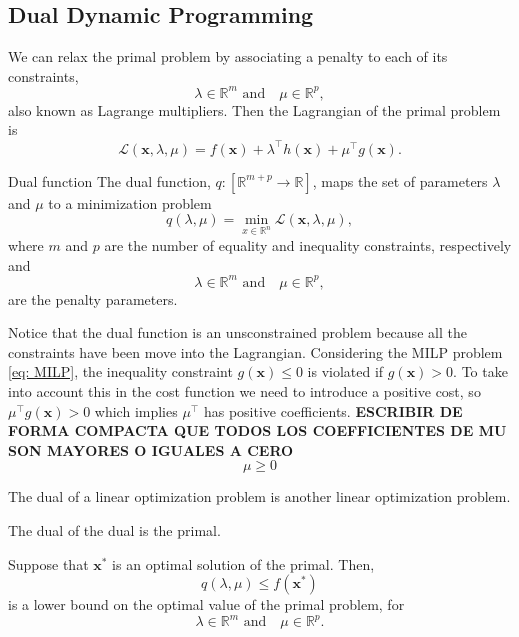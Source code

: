 \subsection{Dual Dynamic Programming}
We can relax the primal problem by associating a penalty to each of its constraints,
\begin{equation}
    \lambda\in\mathbb{R}^{m}\,\, \text{and} \quad \mu\in\mathbb{R}^{p},
\end{equation}
also known as Lagrange multipliers. Then the Lagrangian of the primal problem is
\begin{equation}
    \mathcal{L}(\textbf{x}, \lambda, \mu) = f(\textbf{x}) + \lambda^{\intercal}h(\textbf{x}) + \mu^{\intercal}g(\textbf{x}).
\end{equation}
\begin{definition}{Dual function}{}
The dual function, $q: \left[\mathbb{R}^{m+p}\rightarrow\mathbb{R}\right]$, maps the set of parameters $\lambda$ and $\mu$ to a minimization problem
\begin{equation}
    q(\lambda, \mu) = \min_{x\in\mathbb{R}^{n}}\mathcal{L}(\textbf{x}, \lambda, \mu),
\end{equation}
where $m$ and $p$ are the number of equality and inequality constraints, respectively and
\begin{equation}
    \lambda\in\mathbb{R}^{m}\,\, \text{and} \quad \mu\in\mathbb{R}^{p},
\end{equation}
are the penalty parameters.
\end{definition}
Notice that the dual function is an unsconstrained problem because all the constraints have been move into the Lagrangian.
Considering the MILP problem \eqref{eq: MILP}, the inequality constraint $g(\textbf{x})\leq 0$ is violated if $g(\textbf{x})>0$. To take into account this in the cost function we need to introduce a positive cost, so $\mu^{\intercal}g(\textbf{x})>0$ which implies $\mu^{\intercal}$ has positive coefficients. \textbf{ESCRIBIR DE FORMA COMPACTA QUE TODOS LOS COEFFICIENTES DE MU SON MAYORES O IGUALES A CERO}
\begin{equation}
    \mu \geq 0
\end{equation}
\begin{theorem}{}{}
The dual of a linear optimization problem is another linear optimization problem.
\end{theorem}
\begin{theorem}{}{}
The dual of the dual is the primal.
\end{theorem}
\begin{theorem}{}{}
Suppose that $\textbf{x}^{*}$ is an optimal solution of the primal. Then,
\begin{equation}
    q(\lambda, \mu) \leq f(\textbf{x}^{*})
\end{equation}
is a lower bound on the optimal value of the primal problem, for
\begin{equation}
    \lambda\in\mathbb{R}^{m}\,\, \text{and} \quad \mu\in\mathbb{R}^{p}.
\end{equation}
\end{theorem}
